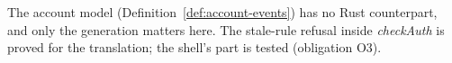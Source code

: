 The account model (Definition~\ref{def:account-events}) has no Rust
counterpart, and only the generation matters here. The stale-rule refusal inside
\textit{checkAuth} is proved for the translation; the shell's part is tested
(obligation O3).


